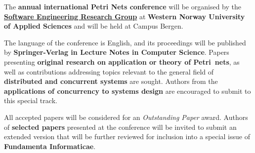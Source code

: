 \documentclass[10pt,a4paper]{article}
\begin{document}
\bigskip
\noindent
The {\bf{} annual international Petri Nets conference} will be organised by the {\bf \href{https://www.hvl.no/en/research/group/software-engineering/}{Software Engineering Research Group}} at {\bf Western Norway University of Applied Sciences} and will be held at Campus Bergen.

%
\smallskip
\noindent
The language of the conference is English, and its proceedings will be published by
{\bf Springer-Verlag in Lecture Notes in Computer Science}.
Papers presenting {\bf original research on application or theory of Petri nets}, as well
as contributions addressing topics relevant to the general field of {\bf distributed and
concurrent systems} are sought. Authors from the {\bf applications of concurrency
to systems
design} are encouraged to submit to this special track.

\smallskip
\noindent
All accepted papers will be considered for an \textit{Outstanding
Paper} award. Authors of {\bf selected papers} presented at the conference will be invited
to submit an extended version that will be further reviewed for inclusion into a special
issue of {\bf Fundamenta Informaticae}.
\end{document}
